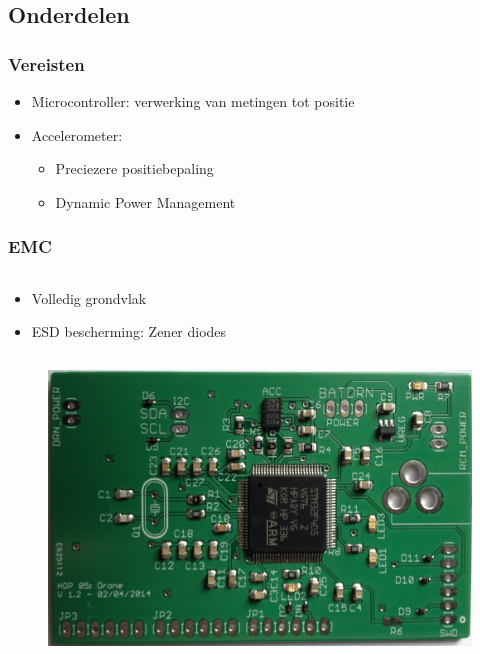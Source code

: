 \documentclass{beamer}
\begin{document}
\subsection{Onderdelen}
  \begin{frame}
    \frametitle{Vereisten}
    \begin{itemize}
      \item Microcontroller: verwerking van metingen tot positie
      \item Accelerometer:
      \begin{itemize}
      	\item Preciezere positiebepaling
      	\item Dynamic Power Management
      \end{itemize}
    \end{itemize}
  \end{frame}
  \begin{frame}
  	\frametitle{EMC}
      \begin{columns}[t]
        \begin{column}[T]{.5\textwidth}
          \begin{itemize}
            \item Volledig grondvlak
            \item ESD bescherming: Zener diodes
          \end{itemize}
        \end{column}
        \begin{column}[T]{.5\textwidth}
          \centering
        \end{column}
      \end{columns}
  \end{frame}
  \begin{frame}
    \begin{figure}
      \begin{center}
        \includegraphics[width=\textwidth]{images/final.eps}
      \end{center}
    \end{figure}
  \end{frame}
\end{document}
